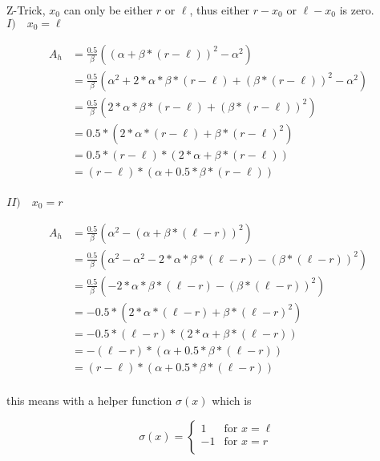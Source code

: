 Z-Trick, $x_0$ can only be either $r$ or $\ell$, thus either $r - x_0$ or $\ell - x_0$ is zero. \\

\textbf{$I) \quad x_0 = \ell$}

\begin{align*}
A_h &= \frac{0.5}{\beta} \left( (\alpha + \beta * (r - \ell))^2 - \alpha^2  \right) \\
&= \frac{0.5}{\beta} \left( \alpha^2 + 2 * \alpha * \beta * (r - \ell) + (\beta * (r - \ell))^2 - \alpha^2  \right) \\
&= \frac{0.5}{\beta} \left( 2 * \alpha * \beta * (r - \ell) + (\beta * (r - \ell))^2 \right) \\
&= 0.5 * \left( 2 * \alpha * (r - \ell) + \beta * (r - \ell)^2 \right) \\
&= 0.5 * (r - \ell) * \left( 2 * \alpha  + \beta * (r - \ell) \right) \\
&= (r - \ell) * \left(\alpha  + 0.5 * \beta * (r - \ell) \right) \\
\end{align*}

\textbf{$II) \quad x_0 = r$}

\begin{align*}
A_h &= \frac{0.5}{\beta} \left( \alpha^2 - (\alpha + \beta * (\ell - r))^2 \right) \\
&= \frac{0.5}{\beta} \left( \alpha^2 - \alpha^2 - 2 * \alpha * \beta * (\ell - r) - (\beta * (\ell - r))^2   \right) \\
&= \frac{0.5}{\beta} \left( - 2 * \alpha * \beta * (\ell - r) - (\beta * (\ell - r))^2 \right) \\
&= -0.5 * \left( 2 * \alpha * (\ell - r) + \beta * (\ell - r)^2 \right) \\
&= -0.5 * (\ell - r) * \left( 2 * \alpha  + \beta * (\ell - r) \right) \\
&= - (\ell - r) * \left( \alpha  + 0.5 * \beta * (\ell - r) \right) \\
&= (r - \ell) * \left( \alpha  + 0.5 * \beta * (\ell - r) \right) \\
\end{align*}

this means with a helper function $\sigma(x)$ which is

\[
	\sigma(x) =
	\begin{cases}
		1 & \text{for } x = \ell \\
		-1 & \text{for } x = r \\
	\end{cases}
\]

